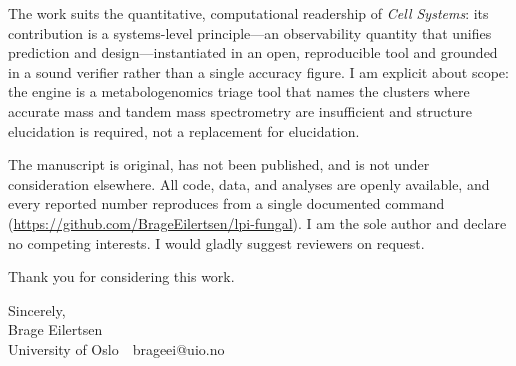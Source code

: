 \documentclass[11pt]{article}
\begin{document}
The work suits the quantitative, computational readership of \textit{Cell Systems}: its contribution is
a systems-level principle---an observability quantity that unifies prediction and design---instantiated
in an open, reproducible tool and grounded in a sound verifier rather than a single accuracy figure. I
am explicit about scope: the engine is a metabologenomics triage tool that names the clusters where
accurate mass and tandem mass spectrometry are insufficient and structure elucidation is required, not
a replacement for elucidation.

The manuscript is original, has not been published, and is not under consideration elsewhere. All code,
data, and analyses are openly available, and every reported number reproduces from a single documented
command (\url{https://github.com/BrageEilertsen/lpi-fungal}). I am the sole author and declare no
competing interests. I would gladly suggest reviewers on request.

\vspace{2pt}
Thank you for considering this work.

\vspace{6pt}
\noindent Sincerely,\\[18pt]
Brage Eilertsen\\
{\small University of Oslo \,\textbar\, brageei@uio.no}
\end{document}
